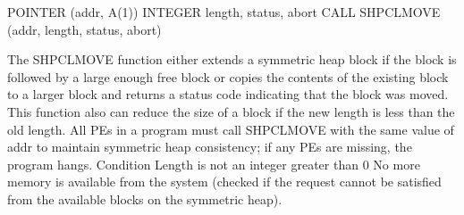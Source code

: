 
\synF   %

       POINTER (addr, A(1))
       INTEGER length, status, abort
       CALL SHPCLMOVE (addr, length, status, abort)

 {       The SHPCLMOVE function either extends a symmetric  heap	block  if  the
       block  is  followed by a large enough free block or copies the contents
       of the existing block to a larger  block	 and  returns  a  status  code
       indicating that the block was moved.  This function also can reduce the
       size of a block if the new length is less than  the  old	 length.   All
       \ac{PE}s  in a program must call SHPCLMOVE with the
       same value of addr to maintain symmetric heap consistency; if  any  \ac{PE}s
       are missing, the program hangs.
 }
{
{}
\desR{ }
 {Condition}
 {Length is not an integer greater than 0}
 { No more memory is available from the system (checked  if the  request  cannot  be	satisfied from the available blocks on the symmetric heap).}
}%
\notesB{ }   
\eAPI 